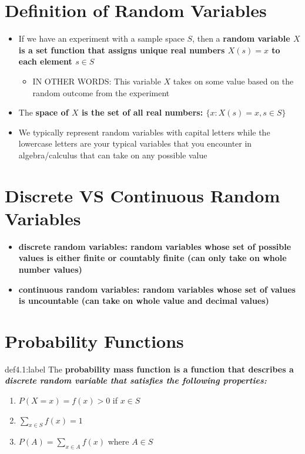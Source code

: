 \section{Definition of Random Variables}

\begin{itemize}
    \item If we have an experiment with a sample space $S$, then a \bf{random variable} $X$ is a set function that assigns unique real numbers $X(s)=x$ to each element $s \in S$
    \begin{itemize}
        \item IN OTHER WORDS: This variable $X$ takes on some value based on the random outcome from the experiment
    \end{itemize}

    \item The \bf{space} of $X$ is the set of all real numbers: $\{x:X(s) = x, s \in S\}$
    \item We typically represent random variables with capital letters while the lowercase letters are your typical variables that you encounter in algebra/calculus that can take on any possible value
\end{itemize}


\section{Discrete VS Continuous Random Variables}

\begin{itemize}
    \item \bf{discrete random variables:} random variables whose set of possible values is either finite or countably finite (can only take on whole number values)
    \item \bf{continuous random variables:} random variables whose set of values is uncountable (can take on whole value and decimal values)
\end{itemize}


\section{Probability Functions}

\begin{definition}{def4.1:label}
    The \bf{probability mass function} is a function that describes a \it{discrete random variable} that satisfies the following properties:

    \begin{enumerate}
        \item $P(X = x) = f(x) > 0$ if $x \in S$
        \item $\sum_{x \in S} f(x) = 1$
        \item $P(A) = \sum_{x \in A} f(x)$ where $A \in S$
    \end{enumerate}
\end{definition}

